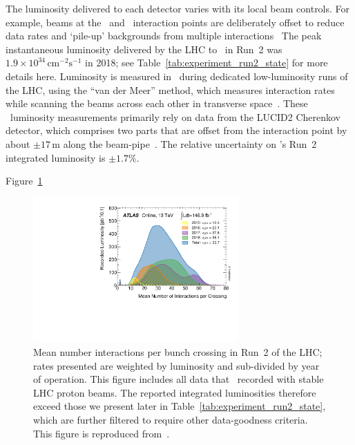 The luminosity delivered to each detector varies with its local beam controls.
For example, beams at the \lhcb\ and \alice\ interaction points are
deliberately offset to reduce data rates and `pile-up' backgrounds from
multiple interactions~\cite{Follin:2014nva}
The peak instantaneous luminosity delivered by the LHC to \atlas\ in Run~2 was
$1.9\times10^{34}\,\mathrm{cm}^{-2}\mathrm{s}^{-1}$ in 2018;
see Table~\ref{tab:experiment_run2_state} for more details here.
Luminosity is measured in \atlas\ during dedicated low-luminosity runs of the
LHC, using the ``van der Meer'' method, which measures interaction rates while
scanning the beams across each other in transverse
space~\cite{vanderMeer:296752,ATLAS:2022hro}.
These \atlas\ luminosity measurements primarily rely on data from the
LUCID2 Cherenkov detector, which comprises two parts that are offset from the
interaction point by about $\pm 17\,\mathrm{m}$ along the beam-pipe~\cite{
SBARRA2019152,
Avoni_2018
}.
The relative uncertainty on \atlas's Run~2 integrated luminosity is $\pm1.7\%$.

Figure~\ref{fig:experiment_run_2_mu}

\begin{figure}[tp]
\centering
\includegraphics[width=0.7\textwidth]{figures/atlas_pileup_mu_2015_2018.pdf}
\caption[
Mean number interactions per bunch crossing in Run~2 of the LHC
]{%
Mean number interactions per bunch crossing in Run~2 of the LHC;
rates presented are weighted by luminosity and sub-divided by year of
operation.
This figure includes all data that \atlas\ recorded with stable LHC proton
beams.
The reported integrated luminosities therefore exceed those we present later
in Table~\ref{tab:experiment_run2_state}, which are further filtered to require
other data-goodness criteria.
This figure is reproduced from~\cite{atlas_public_luminosity}.
}
\label{fig:experiment_run_2_mu}
\end{figure}


